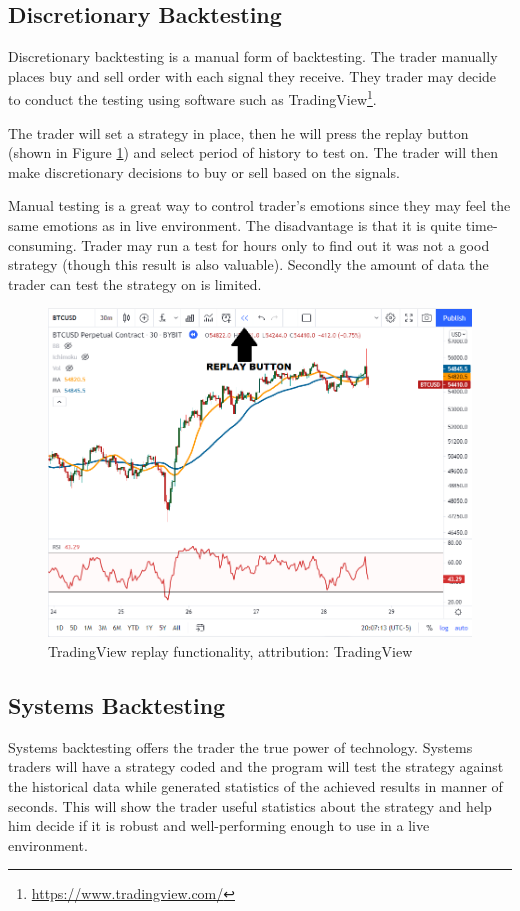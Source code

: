 \subsection*{Discretionary Backtesting}
Discretionary backtesting is a manual form of backtesting. The trader manually places buy and sell order with each signal they receive. They trader may decide to conduct the testing using software such as TradingView\footnote{\url{https://www.tradingview.com/}}.

The trader will set a strategy in place, then he will press the replay button (shown in Figure \ref{tradingview-figure}) and select period of history to test on. The trader will then make discretionary decisions to buy or sell based on the signals.

Manual testing is a great way to control trader's emotions since they may feel the same emotions as in live environment. The disadvantage is that it is quite time-consuming. Trader may run a test for hours only to find out it was not a good strategy (though this result is also valuable). Secondly the amount of data the trader can test the strategy on is limited.

\begin{figure}[!hbt]
    \centering
    \includegraphics[width=\columnwidth]{figures/tradingview-replay.png}
    \caption{TradingView replay functionality, attribution: TradingView~\cite{backtesting-crypto-trading-strategies}}
    \label{tradingview-figure}
\end{figure}

\subsection*{Systems Backtesting}
Systems backtesting offers the trader the true power of technology. Systems traders will have a strategy coded and the program will test the strategy against the historical data while generated statistics of the achieved results in manner of seconds. This will show the trader useful statistics about the strategy and help him decide if it is robust and well-performing enough to use in a live environment.

